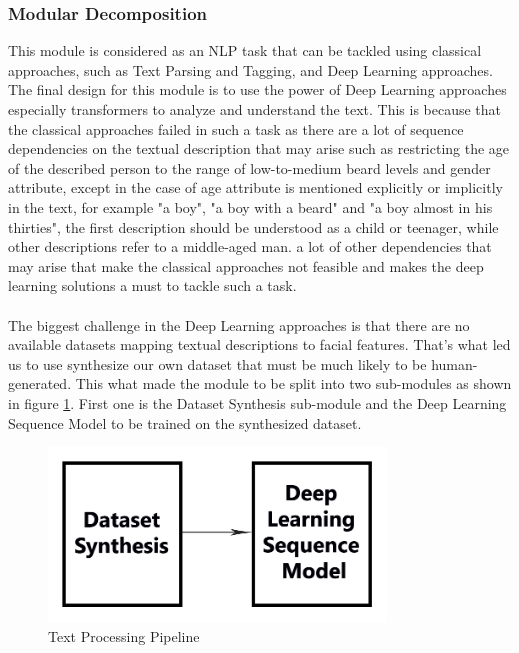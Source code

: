 \subsubsection{Modular Decomposition}
This module is considered as an NLP task that can be tackled using classical approaches, such as Text Parsing and Tagging, and Deep Learning approaches. The final design for this module is to use the power of Deep Learning approaches especially transformers to analyze and understand the text. This is because that the classical approaches failed in such a task as there are a lot of sequence dependencies on the textual description that may arise such as restricting the age of the described person to the range of low-to-medium beard levels and gender attribute, except in the case of age attribute is mentioned explicitly or implicitly in the text, for example "a boy", "a boy with a beard" and "a boy almost in his thirties", the first description should be understood as a child or teenager, while other descriptions refer to a middle-aged man. a lot of other dependencies that may arise that make the classical approaches not feasible and makes the deep learning solutions a must to tackle such a task. 
\\
\\
The biggest challenge in the Deep Learning approaches is that there are no available datasets mapping textual descriptions to facial features. That’s what led us to use synthesize our own dataset that must be much likely to be human-generated. This what made the module to be split into two sub-modules as shown in figure \ref{fig:text_processing_pipeline}. First one is the Dataset Synthesis sub-module and the Deep Learning Sequence Model to be trained on the synthesized dataset.


\begin{figure}[H]
        \centering
        \includegraphics[width=0.8\textwidth]{images/text-processing-submodule.png}
        \caption{Text Processing Pipeline}
        \label{fig:text_processing_pipeline}
    \end{figure}

